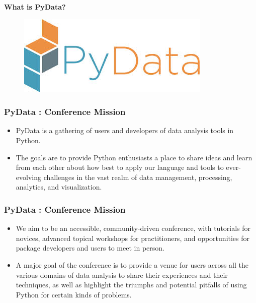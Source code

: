 \documentclass[MASTER.tex]{subfiles}
\begin{document}
 
	\begin{frame}
		\textbf{What is PyData?}
		\begin{figure}
			\centering
			\includegraphics[width=1.05\linewidth]{pydatalogo}
			
		\end{figure}
		
	\end{frame}
	\begin{frame}
		\frametitle{PyData :  Conference Mission}
		\Large
		
		\begin{itemize}
			\item PyData is a gathering of users and developers of data analysis tools in Python. \bigskip
			\item The goals are to provide Python enthusiasts a place to share ideas and learn from each other about how best to apply our language and tools to ever-evolving challenges in the vast realm of data management, processing, analytics, and visualization.
		\end{itemize}
		
		
	\end{frame}
	\begin{frame}
		\Large
		\frametitle{PyData :  Conference Mission}
		\Large
		\begin{itemize}
			\item We aim to be an accessible, community-driven conference, with tutorials for novices, advanced topical workshops for practitioners, and opportunities for package developers and users to meet in person.
			
			\item A major goal of the conference is to provide a venue for users across all the various domains of data analysis to share their experiences and their techniques, as well as highlight the triumphs and potential pitfalls of using Python for certain kinds of problems.
		\end{itemize}
	\end{frame}
\end{document}
